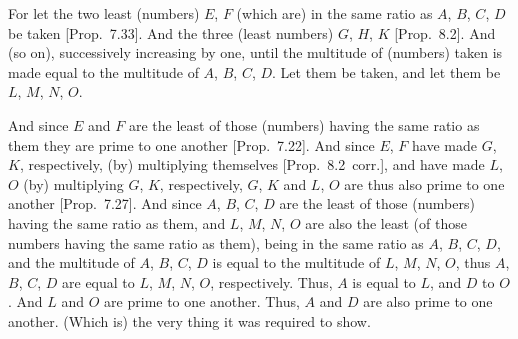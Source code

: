 \begin{Parallel}{}{}
{For let the two 
least (numbers) $E$, $F$ (which are) in the same ratio as $A$, $B$, $C$,
$D$
be taken [Prop.~7.33]. And the three
(least numbers) $G$, $H$, $K$ [Prop.~8.2].
And (so on), successively increasing by one, until the multitude of
(numbers) taken is made equal to the multitude of $A$, $B$, $C$,  $D$.
Let them be taken, and let them be $L$, $M$, $N$,  $O$.

And since $E$ and $F$ are the least of those (numbers) having the
same ratio as them they are prime to one another [Prop.~7.22]. And since  $E$, $F$ have made
 $G$,  $K$, respectively, (by) multiplying themselves [Prop.~8.2~corr.], and  have made $L$,  $O$ 
(by) multiplying  $G$, $K$, respectively,  $G$, $K$ and $L$, $O$ are thus
 also prime to one another [Prop.~7.27]. 
And since $A$, $B$, $C$, $D$ are the least of those (numbers) having
the same ratio as them, and $L$, $M$, $N$,  $O$ are also the
least (of those numbers having the same ratio as them), being in the
same ratio as $A$, $B$, $C$, $D$, and the
multitude of $A$, $B$, $C$,  $D$ is equal to the multitude
of $L$, $M$, $N$,  $O$,  thus $A$, $B$, $C$,  $D$ are
equal to  $L$, $M$, $N$,  $O$, respectively. Thus, $A$ is equal to $L$, and $D$ to $O$. And $L$ and $O$ are prime to one another. Thus,
$A$ and $D$ are also prime to one another. (Which is) the very thing it was required to show.}
\end{Parallel}

